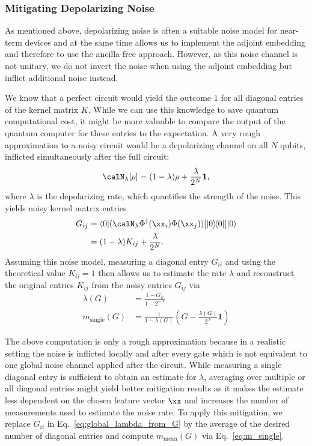 \documentclass[twocolumn,superscriptaddress,nofootinbib]{revtex4-2}
\newcommand{\dyad}[2]{|#1\rangle \! \langle #2|}
\begin{document}
\subsubsection{Mitigating Depolarizing Noise} \label{sec:device_noise_mitigation}
As mentioned above, depolarizing noise is often a suitable noise model for near-term devices and at the same time allows us to implement the adjoint embedding and therefore to use the ancilla-free approach.
However, as this noise channel is not unitary, we do not invert the noise when using the adjoint embedding but inflict additional noise instead.

We know that a perfect circuit would yield the outcome $1$ for all diagonal entries of the kernel matrix $K$. While we can use this knowledge to save quantum computational cost, it might be more valuable to compare the output of the quantum computer for these entries to the expectation.
A very rough approximation to a noisy circuit would be a depolarizing channel on all $N$ qubits, inflicted simultaneously after the full circuit:
\begin{align}
    \calN_\lambda[\rho] = (1-\lambda)\rho + \frac{\lambda}{2^N}\mathbf{1},
\end{align}
where $\lambda$ is the depolarizing rate, which quantifies the strength of the noise.
This yields noisy kernel matrix entries
\begin{align}
    G_{ij} &= \langle 0 | (\calN_\lambda\Phi^{\dagger}(\xx_i)\Phi(\xx_j))[\dyad{0}{0}] | 0 \rangle\\
    &=(1-\lambda) K_{ij} + \frac{\lambda}{2^N}. \label{eq:global_noise_kernel}
\end{align}
Assuming this noise model, measuring a diagonal entry $G_{ii}$ and using the theoretical value $K_{ii}=1$ then allows us to estimate the rate $\lambda$ and reconstruct the original entries $K_{ij}$ from the noisy entries $G_{ij}$ via
\begin{align}
    \lambda(G) &= \frac{1-G_{ii}}{1-2^{-N}} \label{eq:global_lambda_from_G}\\
    m_\mathrm{single}(G) &= \frac{1}{1-\lambda(G)}\left(G-\frac{\lambda(G)}{2^N}\mathbf{1}\right)\label{eq:m_single}
\end{align}

The above computation is only a rough approximation because in a realistic setting the noise is inflicted locally and after every gate which is not equivalent to one global noise channel applied after the circuit.
While measuring a single diagonal entry is sufficient to obtain an estimate for $\lambda$, averaging over multiple or all diagonal entries might yield better mitigation results as it makes the estimate less dependent on the chosen feature vector $\xx$ and increases the number of measurements used to estimate the noise rate.
To apply this mitigation, we replace $G_{ii}$ in Eq.~\eqref{eq:global_lambda_from_G} by the average of the desired number of diagonal entries and compute $m_\mathrm{mean}(G)$ via Eq.~\eqref{eq:m_single}.
\end{document}
